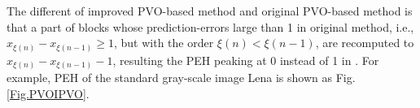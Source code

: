 \documentclass[review,3p,10pt,sort&compress]{elsarticle}
\begin{document}
The different of improved PVO-based method and original PVO-based method is that a part of blocks whose prediction-errors large than 1 in original method, i.e., $x_{\xi(n)}-x_{\xi(n-1)} \geq 1$, but with the order $\xi(n) < \xi(n-1)$, are recomputed to $x_{\xi(n)} - x_{\xi(n-1)} - 1$, resulting the PEH peaking at 0 instead of 1 in \cite{Li2013PVO}. For example, PEH of the standard gray-scale image Lena is shown as Fig. \ref{Fig.PVOIPVO}.
\begin{figure}
\centering
{}
\end{figure}
\end{document}
